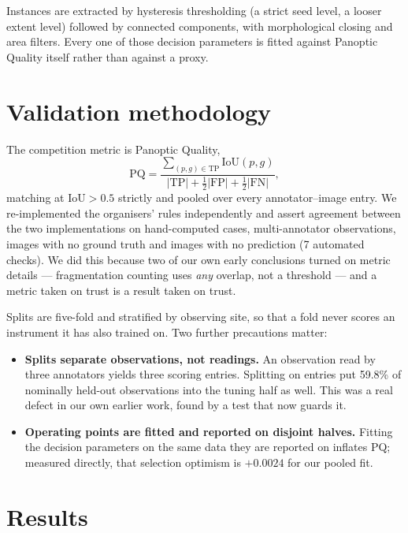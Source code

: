 Instances are extracted by hysteresis thresholding (a strict seed level, a
looser extent level) followed by connected components, with morphological
closing and area filters. Every one of those decision parameters is fitted
against Panoptic Quality itself rather than against a proxy.

\section{Validation methodology}

The competition metric is Panoptic Quality,
\begin{equation}
\mathrm{PQ} = \frac{\sum_{(p,g)\in \mathrm{TP}} \mathrm{IoU}(p,g)}
                   {|\mathrm{TP}| + \tfrac12|\mathrm{FP}| + \tfrac12|\mathrm{FN}|},
\end{equation}
matching at $\mathrm{IoU} > 0.5$ strictly and pooled over every
annotator--image entry. We re-implemented the organisers' rules independently
and assert agreement between the two implementations on hand-computed cases,
multi-annotator observations, images with no ground truth and images with no
prediction (7 automated checks). We did this because two of our own early
conclusions turned on metric details --- fragmentation counting uses
\emph{any} overlap, not a threshold --- and a metric taken on trust is a
result taken on trust.

Splits are five-fold and stratified by observing site, so that a fold never
scores an instrument it has also trained on. Two further precautions matter:

\begin{itemize}
\item \textbf{Splits separate observations, not readings.} An observation read
by three annotators yields three scoring entries. Splitting on entries put
59.8\% of nominally held-out observations into the tuning half as well. This
was a real defect in our own earlier work, found by a test that now guards it.
\item \textbf{Operating points are fitted and reported on disjoint halves.}
Fitting the decision parameters on the same data they are reported on inflates
PQ; measured directly, that selection optimism is $+0.0024$ for our pooled fit.
\end{itemize}

\section{Results}

